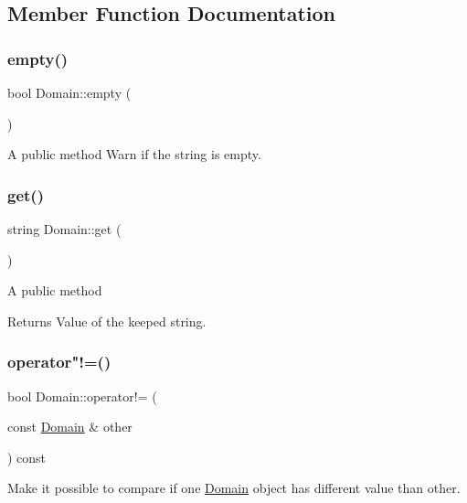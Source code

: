 \subsection{Member Function Documentation}
\mbox{\label{class_domain_ae36e552d1a3bde70b7f448de345a3c9d}} 
\subsubsection{\texorpdfstring{empty()}{empty()}}
{\footnotesize\ttfamily bool Domain\+::empty (\begin{DoxyParamCaption}{ }\end{DoxyParamCaption})}

A public method Warn if the string is empty. \mbox{\label{class_domain_a265e5167062bf41ec78e4245af288c33}} 
\subsubsection{\texorpdfstring{get()}{get()}}
{\footnotesize\ttfamily string Domain\+::get (\begin{DoxyParamCaption}{ }\end{DoxyParamCaption})}

A public method \begin{DoxyReturn}{Returns}
Value of the keeped string. 
\end{DoxyReturn}
\mbox{\label{class_domain_a2791934de616d1bddcd93206b132c323}} 
\subsubsection{\texorpdfstring{operator"!=()}{operator!=()}}
{\footnotesize\ttfamily bool Domain\+::operator!= (\begin{DoxyParamCaption}\item[{const \hyperlink{class_domain}{Domain} \&}]{other }\end{DoxyParamCaption}) const}

Make it possible to compare if one \hyperlink{class_domain}{Domain} object has different value than other. \mbox{\label{class_domain_ac165cf81dfabb07fbfdf0559525fc773}} 
